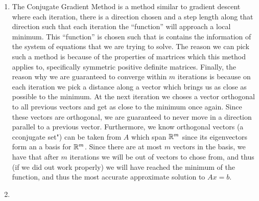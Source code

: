 \documentclass{article}
\begin{document}
    \begin{enumerate}

        \item The Conjugate Gradient Method is a method similar to gradient descent where each iteration, there is a direction chosen and a step length along that direction such that each iteration the ``function'' will approach a local minimum. This ``function'' is chosen such that is contains the information of the system of equations that we are trying to solve. The reason we can pick such a method is because of the properties of martrices which this method applies to, specifically symmetric positive definite matrices. Finally, the reason why we are guaranteed to converge within $m$ iterations is because on each iteration we pick a distance along a vector which brings us as close as possible to the minimum. At the next iteration we choses a vector orthogonal to all previous vectors and get as close to the minimum once again. Since these vectors are orthogonal, we are guaranteed to never move in a direction parallel to a previous vector. Furthermore, we know orthogonal vectors (a cconjugate set") can be taken from $A$ which span $\mathbb{R}^{m}$ since its eigenvectors form an a basis for $\mathbb{R}^m$. Since there are at most $m$ vectors in the basis, we have that after $m$ iterations we will be out of vectors to chose from, and thus (if we did out work properly) we will have reached the minimum of the function, and thus the most accurate approximate solution to $Ax = b$. 
    
        \item 


\end{enumerate}
\end{document}
